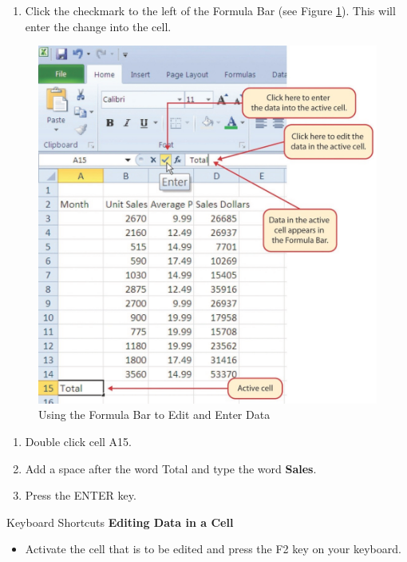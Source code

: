 \begin{enumerate}[resume]
	\item Click the checkmark to the left of the Formula Bar (see Figure \ref{01:fig17}). This will enter the change into the cell.
\end{enumerate}

\begin{figure}[H]
	\centering
	\includegraphics[width=\maxwidth{.95\linewidth}]{gfx/ch01_fig17}
	\caption{Using the Formula Bar to Edit and Enter Data}
	\label{01:fig17}
\end{figure}

\begin{enumerate}[resume]
	\item Double click cell \textsf{A15}.
	\item Add a space after the word Total and type the word \textbf{Sales}.
	\item Press the ENTER key.
\end{enumerate}

\begin{center}
	\begin{shtcutbox}{Keyboard Shortcuts}
		\textbf{Editing Data in a Cell}
		\\
		\begin{itemize}
			\setlength{\itemsep}{0pt}
			\setlength{\parskip}{0pt}
			\setlength{\parsep}{0pt}
			
			\item Activate the cell that is to be edited and press the \textsf{F2} key on your keyboard.
			
		\end{itemize}
	\end{shtcutbox}
\end{center}

